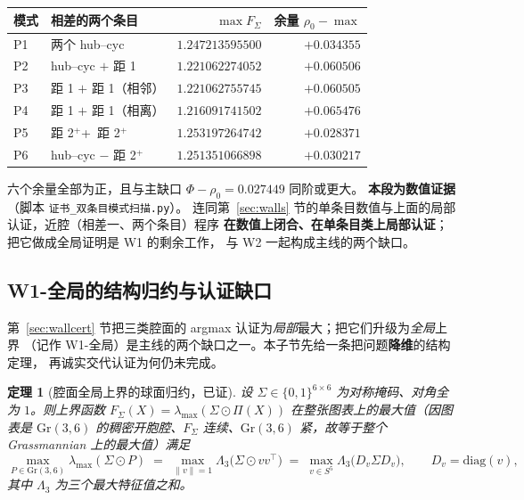 \documentclass[UTF8,11pt]{ctexart}
\newtheorem{theorem}{定理}[section]
\theoremstyle{definition}
\newcommand{\Lam}{\Lambda}
\begin{document}
\begin{center}
{\small
\begin{tabular}{@{}llrr@{}}
\toprule
模式 & 相差的两个条目 & $\max F_\Sigma$ & 余量 $\rho_0-\max$ \\
\midrule
P1 & 两个 hub--cyc         & $1.247213595500$ & $+0.034355$ \\
P2 & hub--cyc $+$ 距 1     & $1.221062274052$ & $+0.060506$ \\
P3 & 距 1 $+$ 距 1（相邻） & $1.221062755745$ & $+0.060505$ \\
P4 & 距 1 $+$ 距 1（相离） & $1.216091741502$ & $+0.065476$ \\
P5 & 距 2$^+ $+$\,$ 距 2$^+$ & $1.253197264742$ & $+0.028371$ \\
P6 & hub--cyc $-$ 距 2$^+$ & $1.251351066898$ & $+0.030217$ \\
\bottomrule
\end{tabular}}
\end{center}

六个余量全部为正，且与主缺口 $\Phi-\rho_0=0.027449$ 同阶或更大。
\textbf{本段为数值证据}（脚本 \texttt{证书\_双条目模式扫描.py}）。
连同第~\ref{sec:walls} 节的单条目数值与上面的局部认证，近腔（相差一、两个条目）程序
\textbf{在数值上闭合、在单条目类上局部认证}；把它做成全局证明是 W1 的剩余工作，
与 W2 一起构成主线的两个缺口。

\subsection{W1-全局的结构归约与认证缺口}\label{sec:w1global}

第~\ref{sec:wallcert} 节把三类腔面的 argmax 认证为\emph{局部}最大；把它们升级为\emph{全局}上界
（记作 W1-全局）是主线的两个缺口之一。本子节先给一条把问题\textbf{降维}的结构定理，
再诚实交代认证为何仍未完成。

\begin{theorem}[腔面全局上界的球面归约，已证]\label{thm:wallreduce}
设 $\Sigma\in\{0,1\}^{6\times6}$ 为对称掩码、对角全为 $1$。则上界函数
$F_\Sigma(X)=\lambda_{\max}(\Sigma\odot\Pi(X))$ 在整张图表上的最大值（因图表是 $\mathrm{Gr}(3,6)$
的稠密开胞腔、$F_\Sigma$ 连续、$\mathrm{Gr}(3,6)$ 紧，故等于整个 Grassmannian 上的最大值）满足
\[
\max_{P\in\mathrm{Gr}(3,6)}\lambda_{\max}(\Sigma\odot P)\;=\;\max_{\|v\|=1}\Lam_3\bigl(\Sigma\odot vv^\top\bigr)
\;=\;\max_{v\in S^5}\Lam_3\bigl(D_v\Sigma D_v\bigr),\qquad D_v=\mathrm{diag}(v),
\]
其中 $\Lam_3$ 为三个最大特征值之和。
\end{theorem}
\end{document}
